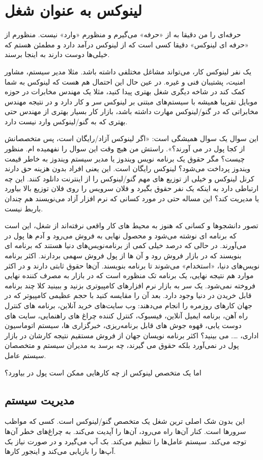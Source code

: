 \section{لینوکس به عنوان شغل}
حرفه‌ای را من دقیقا به از «حرفه» می‌گیرم و منظورم «وارد» نیست. منظورم از «حرفه ای لینوکس» دقیقا کسی است که از لینوکس درآمد دارد و مطمئن هستم که خیلی‌ها دوست دارند به اینجا برسند.

یک نفر لینوکس کار، می‌تواند مشاغل مختلفی داشته باشد. مثلا مدیر سیستم، مشاور امنیت، پشتیبان فنی و غیره. در عین حال این احتمال هم هست که لینوکس به شما کمک کند در شاخه دیگری شغل بهتری پیدا کنید، مثلا یک مهندس مخابرات در حوزه موبایل تقریبا همیشه با سیستم‌های مبتنی بر لینوکس سر و کار دارد و در نتیجه مهندس مخابراتی که در گنو/لینوکس مهارت داشته باشد، بازار کار بسیار بهتری از مهندس حتی بهتری که به گنو/لینوکس وارد نیست دارد.

این سوال یک سوال همیشگی است: «اگر لینوکس آزاد/رایگان است، پس متخصصانش از کجا پول در می آورند؟».
راستش من هیچ وقت این سوال را نفهمیده ام. منظور چیست؟ مگر حقوق یک برنامه نویس ویندوز یا مدیر سیستم ویندوز به خاطر قیمت ویندوز پرداخت می‌شود؟ لینوکس رایگان است. این یعنی افراد بدون هزینه حق دارند کرنل لینوکس و خیلی از توزیع های مهم گنو/لینوکس را از اینترنت دانلود کنند. این چه ارتباطی دارد به اینکه یک نفر حقوق بگیرد و فلان سرویس را روی فلان توزیع بالا بیاورد یا مدیریت کند؟ این مساله حتی در مورد کسانی که نرم افزار آزاد می‌نویسند هم چندان باربط نیست.

تصور دانشجوها و کسانی که هنوز به محیط های کار واقعی نرفته‌اند از شغل، این است که برنامه ای نوشته می‌شود و محصول نهایی به فروش می‌رود و آدم ها پول در می‌آورند. در حالی که درصد خیلی کمی از برنامه‌نویس‌های دنیا هستند که برنامه ای بنویسند که در بازار فروش رود و آن ها از پول فروش سهمی بردارند. اکثر برنامه نویس‌های دنیا، «استخدام» می‌شوند تا برنامه بنویسند. آن‌ها حقوق ثابتی دارند و در اکثر موارد هم نتیجه نهایی، یک برنامه تک منظوره است که در بازار به مصرف کننده نهایی فروخته نمی‌شود. یک سر به بازار نرم افزارهای کامپیوتری بزنید و ببینید کلا چند برنامه قابل خریدن در دنیا وجود دارد. بعد آن را مقایسه کنید با حجم عظیمی کامپیوتر که در جهان کارهای روزمره را انجام می‌دهند: وب سایت‌های خرید آنلاین، برنامه های کنترل راه آهن، برنامه ایمیل آنلاین، فیسبوک، کنترل کننده چراغ های راهنمایی، سایت های دوست یابی، قهوه جوش های قابل برنامه‌ریزی، خبرگزاری ها، سیستم اتوماسیون اداری، …. می بینید؟ اکثر برنامه نویسان جهان از فروش مستقیم نتیجه کارشان در بازار پول در نمی‌آورد بلکه حقوق می گیرند، چه برسد به مدیران سیستم و متخصصان سیستم عامل.

اما یک متخصص لینوکس از چه کارهایی ممکن است پول در بیاورد؟
\subsection*{مدیریت سیستم}
این بدون شک اصلی ترین شغل یک متخصص گنو/لینوکس است. کسی که مواظب سرورها است. کنار آن‌ها راه می‌رود، آن‌ها را آپدیت می‌کند. به چراغ‌های خطر آن‌ها توجه می‌کند. سیستم عامل‌ها را تنظیم می‌کند. بک آپ می‌گیرد و در صورت نیاز بک آپ‌ها را بازیابی می‌کند و اینجور کارها.

